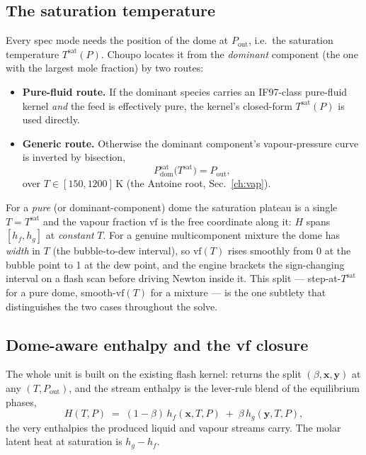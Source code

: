\documentclass[11pt,a4paper]{article}
\newcommand{\Psat}{P^{\mathrm{sat}}}
\newcommand{\xv}{\mathbf{x}}
\newcommand{\yv}{\mathbf{y}}
\begin{document}
\subsection{The saturation temperature}

Every spec mode needs the position of the dome at $P_{\mathrm{out}}$, i.e.\ the
saturation temperature $T^{\mathrm{sat}}(P)$.  Choupo locates it from the
\emph{dominant} component (the one with the largest mole fraction) by two routes:

\begin{itemize}[leftmargin=*,nosep]
  \item \textbf{Pure-fluid route.}  If the dominant species carries an IF97-class
        pure-fluid kernel \emph{and} the feed is effectively pure, the kernel's
        closed-form $T^{\mathrm{sat}}(P)$ is used directly.
  \item \textbf{Generic route.}  Otherwise the dominant component's vapour-pressure
        curve is inverted by bisection,
        \begin{equation}
          \Psat_{\mathrm{dom}}\!\big(T^{\mathrm{sat}}\big) = P_{\mathrm{out}},
          \label{eq:pc-tsat}
        \end{equation}
        over $T\in[150,1200]\,$K (the Antoine root, Sec.~\ref{ch:vap}).
\end{itemize}

For a \emph{pure} (or dominant-component) dome the saturation plateau is a single
$T = T^{\mathrm{sat}}$ and the vapour fraction $\mathrm{vf}$ is the free
coordinate along it: $H$ spans $[h_f,h_g]$ at \emph{constant} $T$.  For a genuine
multicomponent mixture the dome has \emph{width} in $T$ (the bubble-to-dew
interval), so $\mathrm{vf}(T)$ rises smoothly from 0 at the bubble point to 1 at
the dew point, and the engine brackets the sign-changing interval on a flash scan
before driving Newton inside it.  This split --- step-at-$T^{\mathrm{sat}}$ for a
pure dome, smooth-$\mathrm{vf}(T)$ for a mixture --- is the one subtlety that
distinguishes the two cases throughout the solve.

\subsection{Dome-aware enthalpy and the vf closure}

The whole unit is built on the existing flash kernel:
 returns the split $(\beta,\xv,\yv)$ at any
$(T,P_{\mathrm{out}})$, and the stream enthalpy is the lever-rule blend of the
equilibrium phases,
\begin{equation}
  H(T,P) \;=\; (1-\beta)\,h_f(\xv,T,P) \;+\; \beta\,h_g(\yv,T,P),
  \label{eq:pc-Hstream}
\end{equation}
the very enthalpies the produced liquid and vapour streams carry.  The molar
latent heat at saturation is $h_g - h_f$.
\end{document}
